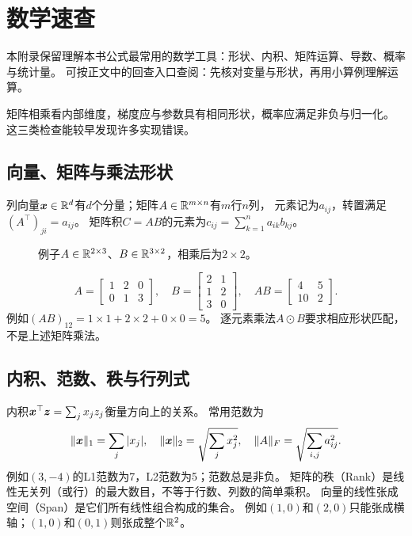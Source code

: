 \chapter{数学速查}
\label{ch:math}

本附录保留理解本书公式最常用的数学工具：形状、内积、矩阵运算、导数、概率与统计量。
可按正文中的回查入口查阅：先核对变量与形状，再用小算例理解运算。

\begin{keyidea}
矩阵相乘看内部维度，梯度应与参数具有相同形状，概率应满足非负与归一化。
这三类检查能较早发现许多实现错误。
\end{keyidea}

\section{向量、矩阵与乘法形状}
\label{sec:math-matrix}
列向量$\boldsymbol{x}\in\mathbb{R}^d$有$d$个分量；矩阵$A\in\mathbb{R}^{m\times n}$有$m$行$n$列，
元素记为$a_{ij}$，转置满足$(A^\top)_{ji}=a_{ij}$。
矩阵积$C=AB$的元素为$c_{ij}=\sum_{k=1}^n a_{ik}b_{kj}$。

\begin{figure}[htbp]
\centering
\caption{例子$A\in\mathbb{R}^{2\times3}$、$B\in\mathbb{R}^{3\times2}$，相乘后为$2\times2$。}
\par\smallskip
{}
\end{figure}
\[
 A=\begin{bmatrix}1&2&0\\0&1&3\end{bmatrix},\quad
 B=\begin{bmatrix}2&1\\1&2\\3&0\end{bmatrix},\quad
 AB=\begin{bmatrix}4&5\\10&2\end{bmatrix}.
\]
例如$(AB)_{12}=1\times1+2\times2+0\times0=5$。
逐元素乘法$A\odot B$要求相应形状匹配，不是上述矩阵乘法。


\section{内积、范数、秩与行列式}
\label{sec:math-norms}
内积$\boldsymbol{x}^\top\boldsymbol{z}=\sum_jx_jz_j$衡量方向上的关系。
常用范数为
\[
 \lVert\boldsymbol{x}\rVert_1=\sum_j|x_j|,\quad
 \lVert\boldsymbol{x}\rVert_2=\sqrt{\sum_jx_j^2},\quad
 \lVert A\rVert_F=\sqrt{\sum_{i,j}a_{ij}^2}.
\]
例如$(3,-4)$的L1范数为7，L2范数为5；范数总是非负。
矩阵的秩（Rank）是线性无关列（或行）的最大数目，不等于行数、列数的简单乘积。
向量的线性张成空间（Span）是它们所有线性组合构成的集合。
例如$(1,0)$和$(2,0)$只能张成横轴；$(1,0)$和$(0,1)$则张成整个$\mathbb{R}^2$。


